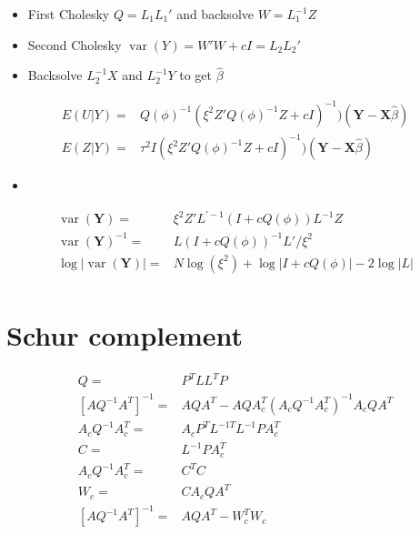 \documentclass[12pt]{article}
\DeclareMathOperator{\var}{var}
\begin{document}
\begin{itemize}
\item First Cholesky  $Q = L_1 L_1'$ and backsolve $W = L_1^{-1}Z$
\item Second Cholesky $\var(Y) = W'W + c I = L_2 L_2'$
\item Backsolve $L_2^{-1}X$ and  $L_2^{-1}Y$ to get $\hat\beta$
\end{itemize}

\begin{align*}
E(U|Y) = &  Q(\phi)^{-1}
(\xi^2 Z' Q(\phi)^{-1}Z + c I)^{-1})
(\mathbf{Y} - \mathbf{X}\hat\beta)\\
E(Z|Y) = & \tau^2 I(\xi^2 Z' Q(\phi)^{-1}Z + c I)^{-1})
(\mathbf{Y} - \mathbf{X}\hat\beta)
\end{align*}

\begin{itemize}
  \item
\end{itemize}
\begin{align*}
\var(\mathbf{Y}) = &  \xi^2  Z ' L^{\prime -1}(  I + c  Q(\phi)  ) L^{-1} Z\\
\var(\mathbf{Y})^{-1} = &    L(  I + c  Q(\phi)  )^{-1} L' / \xi^2\\
\log |\var(\mathbf{Y})| = & N \log(\xi^2) + \log |I + c Q(\phi)| -
2 \log |L|\\
\end{align*}



\section{Schur complement}

\begin{align*}
Q = & P^T L L^T P\\
\left[ A Q^{-1} A^T   \right]^{-1}= &A Q A^T - A Q A_c^T ( A_c Q^{-1} A_c^T )^{-1}  A_c Q A^T\\
 A_c Q^{-1} A_c^T
 = &A_c P^T L^{-1 T} L^{-1} P A_c^T\\
 C = & L^{-1} P A_c^T\\
 A_c Q^{-1} A_c^T =& C^T C\\
W_c = & C A_c Q A^T\\
\left[A Q^{-1} A^T  \right]^{-1} = &A Q A^T - W_c^T W_c 
\end{align*}


\end{document}
